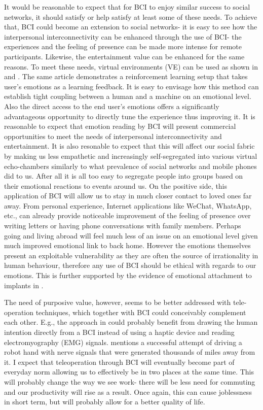 \documentclass[fleqn,11pt]{olplainarticle}
\begin{document}
It would be reasonable to expect that for BCI to enjoy similar success to social networks, it should satisfy or help satisfy at least some of these needs. To achieve that, BCI could become an extension to social networks- it is easy to see how the interpersonal interconnectivity can be enhanced through the use of BCI- the experiences and the feeling of presence can be made more intense for remote participants. Likewise, the entertainment value can be enhanced for the same reasons. To meet these needs, virtual environments (VE) can be used as shown in \cite{shih2017deep} and \cite{luz2017enrichment}. The same article demonstrates a reinforcement learning setup that takes user's emotions as a learning feedback. It is easy to envisage how this method can establish tight coupling between a human and a machine on an emotional level. Also the direct access to the end user's emotions offers a significantly advantageous opportunity to directly tune the experience thus improving it. It is reasonable to expect that emotion reading by BCI will present commercial opportunities to meet the needs of interpersonal interconnectivity and entertainment. It is also resonable to expect that this will affect our social fabric by making us less empathetic and increasingly self-segregated into various virtual echo-chambers similarly to what prevalence of social networks and mobile phones did to us. After all it is all too easy to segregate people into groups based on their emotional reactions to events around us. On the positive side, this application of BCI will allow us to stay in much closer contact to loved ones far away. From personal experience, Internet applications like WeChat, WhatsApp, etc., can already provide noticeable improvement of the feeling of presence over writing letters or having phone conversations with family members. Perhaps going and living abroad will feel much less of an issue on an emotional level given much improved emotional link to back home. However the emotions themselves present an exploitable vulnerability as they are often the source of irrationality in human behaviour, therefore any use of BCI should be ethical with regards to our emotions. This is further supported by the evidence of emotional attachment to implants in \cite{warwick2003cyborg}.

The need of purposive value, however, seems to be better addressed with tele-operation techniques, which together with BCI could conceivably complement each other. E.g., the approach in \cite{luo2019teleoperation} could probably benefit from drawing the human intention directly from a BCI instead of using a haptic device and reading electromyography (EMG) signals. \cite{warwick2003cyborg} mentions a successful attempt of driving a robot hand with nerve signals that were generated thousands of miles away from it. I expect that teleoperation through BCI will eventually become part of everyday norm allowing us to effectively be in two places at the same time. This will probably change the way we see work- there will be less need for commuting and our productivity will rise as a result. Once again, this can cause joblessness in short term, but will probably allow for a better quality of life.
\end{document}
